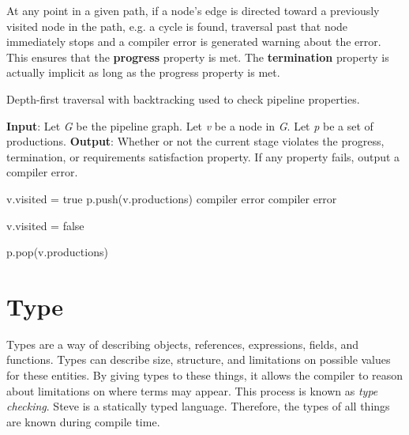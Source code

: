 At any point in a given path, if a node's edge is directed toward a previously visited node in the path, e.g. a cycle is found, traversal past that node immediately stops and a compiler error is generated warning about the error. This ensures that the \textbf{progress} property is met. The \textbf{termination} property is actually implicit as long as the progress property is met.

\begin{algorithm}
 \caption{Depth-first traversal with backtracking used to check pipeline properties.}
 \label{alg:dfs}
 \begin{algorithmic}
 \State
 \State \textbf{Input}: Let \textit{G} be the pipeline graph. Let \textit{v} be a node in \textit{G}. Let \textit{p} be a set of productions.
 \State \textbf{Output}: Whether or not the current stage violates the progress, termination, or requirements satisfaction property. If any property fails, output a compiler error.
 \State

 	\State v.visited = true
 	\State p.push(v.productions)
 				\State {}
 			\Else
 				\State \Return compiler error
 			\EndIf
 		\EndFor
	\Else
 		\State \Return compiler error
 	\EndIf

 	\State v.visited = false 

 	\State p.pop(v.productions) 
 \EndFunction
 \end{algorithmic}

\end{algorithm}

\section{Type} \label{guide:type}

Types are a way of describing objects, references, expressions, fields, and functions. Types can describe size, structure, and limitations on possible values for these entities. By giving types to these things, it allows the compiler to reason about limitations on where terms may appear. This process is known as \textit{type checking}. Steve is a statically typed language. Therefore, the types of all things are known during compile time. 

